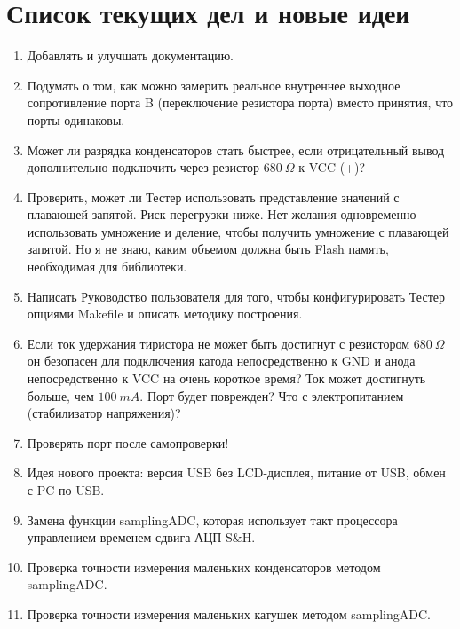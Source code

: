 
\chapter{Список текущих дел и новые идеи}
\label{sec:todo}

\begin{enumerate}
\item Добавлять и улучшать документацию.

\item Подумать о том, как можно замерить реальное внутреннее выходное сопротивление порта B (переключение резистора 
порта) вместо принятия, что порты одинаковы.

\item Может ли разрядка конденсаторов стать быстрее, если отрицательный вывод дополнительно подключить через 
резистор \(680~\Omega\) к VCC (+)?

\item Проверить, может ли Тестер использовать представление значений с плавающей запятой. Риск перегрузки ниже. 
Нет желания одновременно использовать умножение и деление, чтобы получить умножение с плавающей запятой. Но я не 
знаю, каким объемом должна быть Flash память, необходимая для библиотеки.

\item Написать Руководство пользователя для того, чтобы конфигурировать Тестер опциями Makefile и описать методику 
построения.

\item Если ток удержания тиристора не может быть достигнут с резистором \(680~\Omega\) он безопасен для подключения 
катода непосредственно к GND и анода непосредственно к VCC на очень короткое время? Ток может достигнуть больше, 
чем \(100~mA\). Порт будет поврежден? Что с электропитанием (стабилизатор напряжения)? 

\item Проверять порт после самопроверки!

\item Идея нового проекта: версия USB без LCD-дисплея, питание от USB, обмен с PC по USB.

\item Замена функции samplingADC, которая использует такт процессора управлением временем сдвига АЦП S\&H.

\item Проверка точности измерения маленьких конденсаторов методом samplingADC.

\item Проверка точности измерения маленьких катушек методом samplingADC.

\end{enumerate}
